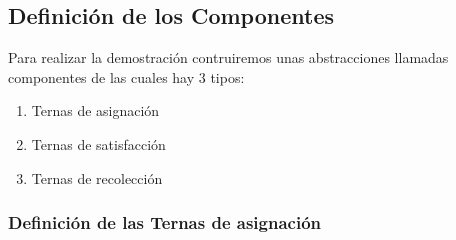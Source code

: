 \documentclass{article}
\begin{document}
\subsection{Definición de los Componentes}
Para realizar la demostración contruiremos unas abstracciones llamadas componentes de las cuales hay 3 tipos:
\begin{enumerate}
    \item Ternas de asignación
    \item Ternas de satisfacción
    \item Ternas de recolección
    
\end{enumerate}

\subsubsection{Definición de las Ternas de asignación}
\end{document}
